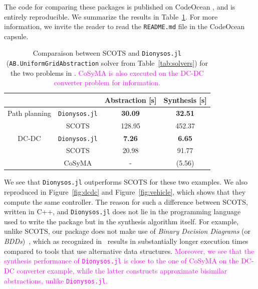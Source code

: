 \documentclass{juliacon}
\begin{document}
\vspace{6pt}

The code for comparing these packages is published on CodeOcean \cite{Calbert2024}, and is entirely reproducible. We summarize the results in Table~\ref{tab:benchmark}. For more information, we invite the reader to read the \texttt{README.md} file in the CodeOcean capsule.

\begin{table}[ht!]
    \centering
    \color{magenta}
    \begin{tabular}{cc|cc}
        & & Abstraction [s] & Synthesis [s] \\ 
        \hline 
        Path planning & \texttt{Dionysos.jl} & \textbf{30.09} & \textbf{32.51} \\
        & SCOTS & 128.95 & 452.37 \\
        \hline
        DC-DC & \texttt{Dionysos.jl} & \textbf{7.26} & \textbf{6.65} \\
        & SCOTS & 20.98 & 91.77 \\ 
        & CoSyMA & - & (5.56)
    \end{tabular}
    \color{black}
    \caption{Comparaison between SCOTS and \texttt{Dionysos.jl} (\texttt{AB.UniformGridAbstraction} solver from Table~\ref{tab:solvers}) for the two problems in \cite{rungger2016scots}. \textcolor{magenta}{CoSyMA is also executed on the DC-DC converter problem for information.}}
    \label{tab:benchmark}
\end{table}

We see that \texttt{Dionysos.jl} outperforms SCOTS for these two examples. We also reproduced \cite[Figures 3 and 4]{rungger2016scots} in Figure~\ref{fig:dcdc} and Figure~\ref{fig:vehicle}, which shows that they compute the same controller. The reason for such a difference between SCOTS, written in C++, and \texttt{Dionysos.jl} does not lie in the programming language used to write the package but in the synthesis algorithm itself. For example, unlike SCOTS, our package does not make use of \emph{Binary Decision Diagrams} (or \emph{BDDs})~\cite{bryant1992symbolic}, which as recognized in~\cite{rungger2016scots} results in substantially longer execution times compared to tools that use alternative data structures. \textcolor{magenta}{Moreover, we see that the synthesis performance of \texttt{Dionysos.jl} is close to the one of CoSyMA on the DC-DC converter example, while the latter constructs approximate bisimilar abstractions, unlike \texttt{Dionysos.jl}.}
\end{document}
